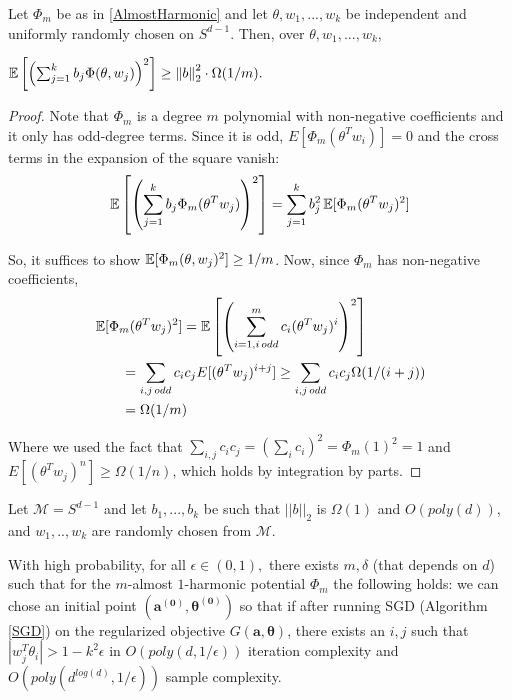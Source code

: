 \begin{lemma}\label{largeVariance}
  Let $\Phi_m$ be as in \ref{AlmostHarmonic}  and let $\theta, w_1,...,w_k$ be
  independent and uniformly randomly chosen on $S^{d-1}$. Then, over
  $\theta, w_1,...,w_k$,
 
 $\operatorname*{\mathbb{E}}\left[\left(  \sum_{j=1}^k b_j \Phi(\theta,w_j)\right)^2\right]
 \geq \left\lVert b \right\rVert_2^2 \cdot \Omega(1/m).$
\end{lemma}
%
\begin{proof}
Note that $\Phi_m$ is a degree $m$ polynomial with non-negative coefficients and it only has odd-degree terms. Since it is odd, $E[\Phi_m(\theta^Tw_i)] = 0$ and the cross terms in the expansion of the square vanish:
%
\[ \operatorname*{\mathbb{E}}\left[\left(  \sum_{j=1}^k b_j
     \Phi_m(\theta^Tw_j)\right)^2\right] = \sum_{j=1}^k b_j^2 \operatorname*{\mathbb{E}}[\Phi_m(\theta^Tw_j)^2]\]

So, it suffices to show $\operatorname*{\mathbb{E}}[\Phi_m(\theta,w_j)^2] \geq 1/m$.  Now, since $\Phi_m$ has non-negative coefficients,
\begin{align*}
& \operatorname*{\mathbb{E}}[\Phi_m(\theta^Tw_j)^2] = \operatorname*{\mathbb{E}}\left[\left(\sum_{i=1, i \,
                               odd}^m c_i
                               (\theta^Tw_j)^i\right)^2\right] \\
& \qquad = \sum_{i,j \,odd} c_ic_j E[(\theta^Tw_j)^{i+j}] \geq \sum_{i,j
  \,odd}c_i c_j \Omega(1/(i+j))  \\
& \qquad =\Omega(1/m) 
\end{align*}

Where we used the fact that
$\sum_{i,j} c_ic_j = (\sum_i c_i)^2 = \Phi_m(1)^2 = 1$ and
$E[(\theta^Tw_j)^{n}] \geq \Omega(1/n)$, which holds by integration by
parts. 
\end{proof}

\begin{theorem}
  Let $\mathcal{M} = S^{d-1}$ and let $b_1,...,b_k$ be such that
  $||b||_2$ is $\Omega(1)$ and $O(poly(d))$, and $w_1,..,w_k$ are
  randomly chosen from $\mathcal{M}$. 
  
  With high probability, for all $\epsilon \in (0,1),$ there exists $m, \delta$ (that depends on $d$) such that for the $m$-almost $1$-harmonic potential $\Phi_m$ the
  following holds: we can chose an initial point $(\boldsymbol{a^{(0)}, \theta^{(0)}})$ so that if after running SGD (Algorithm \ref{SGD}) on the regularized objective
  $G(\boldsymbol{a,\theta})$, there exists an $i, j$ such that $|w_j^T\theta_i| > 1- k^2\epsilon$ in $O(poly(d,1/\epsilon))$ iteration complexity and $O(poly(d^{log(d)},1/\epsilon))$ sample complexity.
\end{theorem}

